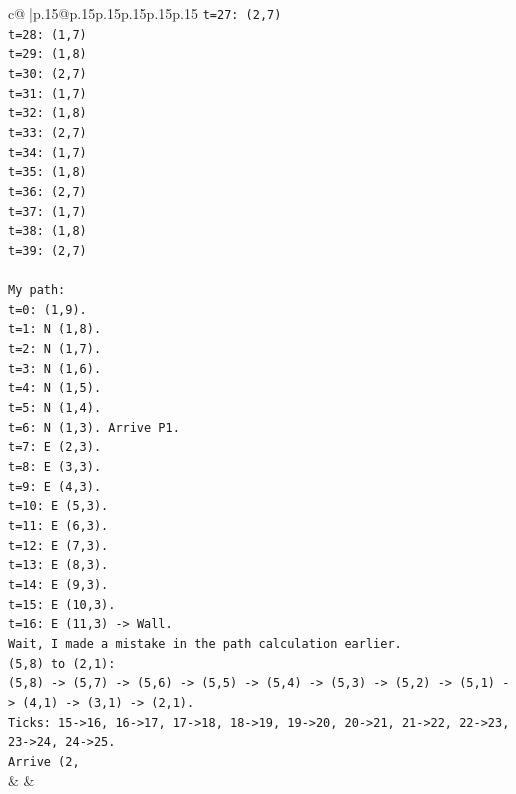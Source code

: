 \documentclass{article}
\begin{document}
{\begin{supertabular}{c@{$\;$}|p{.15\linewidth}@{}p{.15\linewidth}p{.15\linewidth}p{.15\linewidth}p{.15\linewidth}p{.15\linewidth}}
{{{\texttt{t=27: (2,7)} \\
\texttt{t=28: (1,7)} \\
\texttt{t=29: (1,8)} \\
\texttt{t=30: (2,7)} \\
\texttt{t=31: (1,7)} \\
\texttt{t=32: (1,8)} \\
\texttt{t=33: (2,7)} \\
\texttt{t=34: (1,7)} \\
\texttt{t=35: (1,8)} \\
\texttt{t=36: (2,7)} \\
\texttt{t=37: (1,7)} \\
\texttt{t=38: (1,8)} \\
\texttt{t=39: (2,7)} \\
\\ 
\texttt{My path:} \\
\texttt{t=0: (1,9).} \\
\texttt{t=1: N (1,8).} \\
\texttt{t=2: N (1,7).} \\
\texttt{t=3: N (1,6).} \\
\texttt{t=4: N (1,5).} \\
\texttt{t=5: N (1,4).} \\
\texttt{t=6: N (1,3). Arrive P1.} \\
\texttt{t=7: E (2,3).} \\
\texttt{t=8: E (3,3).} \\
\texttt{t=9: E (4,3).} \\
\texttt{t=10: E (5,3).} \\
\texttt{t=11: E (6,3).} \\
\texttt{t=12: E (7,3).} \\
\texttt{t=13: E (8,3).} \\
\texttt{t=14: E (9,3).} \\
\texttt{t=15: E (10,3).} \\
\texttt{t=16: E (11,3) {-}> Wall.} \\
\texttt{Wait, I made a mistake in the path calculation earlier.} \\
\texttt{(5,8) to (2,1):} \\
\texttt{(5,8) {-}> (5,7) {-}> (5,6) {-}> (5,5) {-}> (5,4) {-}> (5,3) {-}> (5,2) {-}> (5,1) {-}> (4,1) {-}> (3,1) {-}> (2,1).} \\
\texttt{Ticks: 15{-}>16, 16{-}>17, 17{-}>18, 18{-}>19, 19{-}>20, 20{-}>21, 21{-}>22, 22{-}>23, 23{-}>24, 24{-}>25.} \\
\texttt{Arrive (2,} \\
            }
        }
    }
    & & \\ \\


\end{supertabular}}
\end{document}
